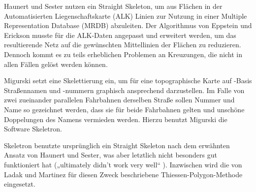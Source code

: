 \documentclass[../main/thesis.tex]{subfiles}
\begin{document}
Haunert und Sester nutzen ein Straight Skeleton, um aus Flächen in der Automatisierten Liegenschaftskarte (ALK) Linien zur Nutzung in einer Multiple Representation Database (MRDB) abzuleiten.
Der Algorithmus von Eppstein und Erickson  musste für die ALK-Daten angepasst und erweitert werden, um das resultierende Netz auf die gewünschten Mittellinien der Flächen zu reduzieren.
Dennoch kommt es zu teils erheblichen Problemen an Kreuzungen, die nicht in allen Fällen gelöst werden können. 


Migurski setzt eine Skelettierung ein, um für eine topographische Karte auf \osm-Basis Straßennamen und -nummern graphisch ansprechend darzustellen.
Im Falle von zwei zueinander parallelen Fahrbahnen derselben Straße sollen Nummer und Name so gezeichnet werden, dass sie für beide Fahrbahnen gelten und unschöne Doppelungen des Namens vermieden werden.
Hierzu benutzt Migurski die Software Skeletron. \citetext{\citealp{ME11}, cf. \citealp{Mig12}}


Skeletron benutzte ursprünglich ein Straight Skeleton nach dem erwähnten Ansatz von Haunert und Sester, was aber letztlich nicht besonders gut funktioniert hat („ultimately didn't work very well“ ).
Inzwischen wird die von Ladak und Martinez für diesen Zweck beschriebene Thiessen-Polygon-Methode eingesetzt.

\end{document}
